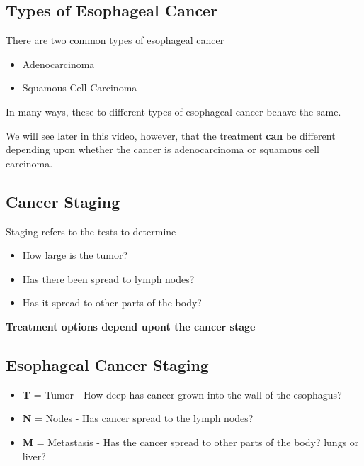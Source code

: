 \documentclass[
  letterpaper,
  DIV=11,
  numbers=noendperiod]{scrartcl}
\providecommand{\tightlist}{%
  \setlength{\itemsep}{0pt}\setlength{\parskip}{0pt}}\usepackage{longtable,booktabs,array}
\begin{document}
\subsection{Types of Esophageal
Cancer}\label{types-of-esophageal-cancer}

There are two common types of esophageal cancer

\begin{itemize}
\tightlist
\item
  Adenocarcinoma
\item
  Squamous Cell Carcinoma
\end{itemize}

In many ways, these to different types of esophageal cancer behave the
same.

We will see later in this video, however, that the treatment
\textbf{can} be different depending upon whether the cancer is
adenocarcinoma or squamous cell carcinoma.

\subsection{Cancer Staging}\label{cancer-staging}

Staging refers to the tests to determine

\begin{itemize}
\tightlist
\item
  How large is the tumor?
\item
  Has there been spread to lymph nodes?
\item
  Has it spread to other parts of the body?
\end{itemize}

\textbf{Treatment options depend upont the cancer stage}

\subsection{Esophageal Cancer Staging}\label{esophageal-cancer-staging}

\begin{itemize}
\tightlist
\item
  \textbf{T} = Tumor - How deep has cancer grown into the wall of the
  esophagus?
\item
  \textbf{N} = Nodes - Has cancer spread to the lymph nodes?
\item
  \textbf{M} = Metastasis - Has the cancer spread to other parts of the
  body? lungs or liver?
\end{itemize}
\end{document}
